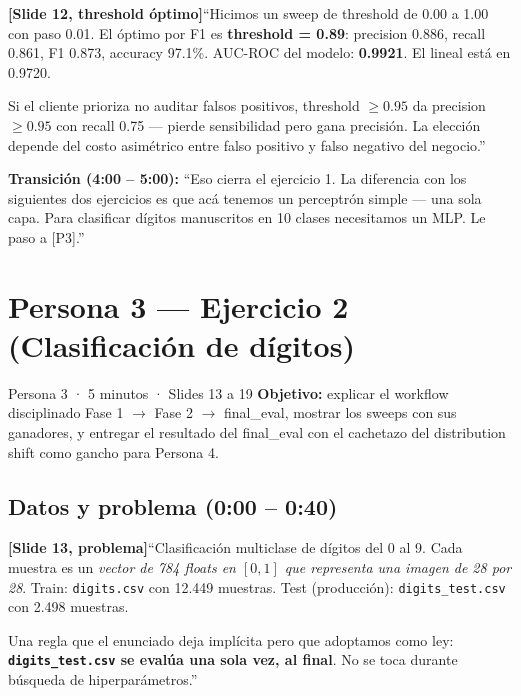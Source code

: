 \documentclass[11pt,a4paper]{article}
\newcommand{\code}[1]{\texttt{\textcolor{accent}{#1}}}
\newcommand{\file}[1]{\texttt{\small #1}}
\newcommand{\slidenum}[1]{\textcolor{accent}{\textbf{[Slide #1]}}}
\newcommand{\timing}[1]{\textcolor{muted}{\small (#1)}}
\newcommand{\enunciado}[1]{\textcolor{warn}{\textit{#1}}}
\begin{document}
\slidenum{12, threshold óptimo}\quad ``Hicimos un sweep de threshold de 0.00 a 1.00 con paso 0.01. El óptimo por F1 es \textbf{threshold = 0.89}: precision 0.886, recall 0.861, F1 0.873, accuracy 97.1\%. AUC-ROC del modelo: \textbf{0.9921}. El lineal está en 0.9720.

Si el cliente prioriza no auditar falsos positivos, threshold $\geq 0.95$ da precision $\geq 0.95$ con recall 0.75 --- pierde sensibilidad pero gana precisión. La elección depende del costo asimétrico entre falso positivo y falso negativo del negocio.''

\begin{cue}
\textbf{Transición \timing{4:00 -- 5:00}:} ``Eso cierra el ejercicio 1. La diferencia con los siguientes dos ejercicios es que acá tenemos un perceptrón simple --- una sola capa. Para clasificar dígitos manuscritos en 10 clases necesitamos un MLP. Le paso a [P3].''
\end{cue}

\section{Persona 3 — Ejercicio 2 (Clasificación de dígitos)}\label{sec:p3}

\begin{persona}{Persona 3 · 5 minutos · Slides 13 a 19}
\textbf{Objetivo:} explicar el workflow disciplinado Fase 1 \(\to\) Fase 2 \(\to\) final\_eval, mostrar los sweeps con sus ganadores, y entregar el resultado del final\_eval con el cachetazo del distribution shift como gancho para Persona 4.
\end{persona}

\subsection{Datos y problema \timing{0:00 -- 0:40}}

\slidenum{13, problema}\quad ``Clasificación multiclase de dígitos del 0 al 9. Cada muestra es un \enunciado{vector de 784 floats en $[0,1]$ que representa una imagen de 28 por 28}. Train: \file{digits.csv} con 12.449 muestras. Test (producción): \file{digits\_test.csv} con 2.498 muestras.

Una regla que el enunciado deja implícita pero que adoptamos como ley: \textbf{\code{digits\_test.csv} se evalúa una sola vez, al final}. No se toca durante búsqueda de hiperparámetros.''
\end{document}
